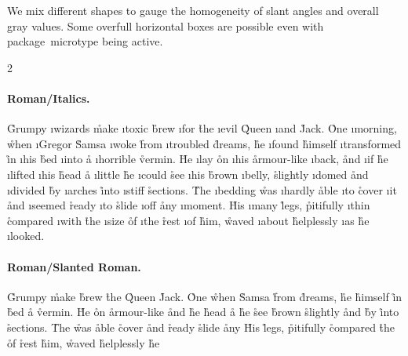 \documentclass[a4paper]{article}
\newcommand*{\packagename}[1]{\mbox{\textsf{#1}}}
\begin{document}
We mix different shapes to gauge the homogeneity of slant angles and
overall gray values.  Some overfull horizontal boxes are possible even with
package~\packagename{microtype} being active.

\setlength{\columnsep}{20pt}
\begin{multicols}{2}\fussy
  \setlength{\overfullrule}{3pt}
  \paragraph{Roman/Italics.}\leavevmode

  \r{Grumpy} \i{wizards} \r{make} \i{toxic} \r{brew} \i{for} \r{the} \i{evil} \r{Queen} \i{and} \r{Jack.}
  \r{One} \i{morning,} \r{when} \i{Gregor} \r{Samsa} \i{woke} \r{from} \i{troubled} \r{dreams,}
  \r{he} \i{found} \r{himself} \i{transformed} \r{in} \i{his} \r{bed} \i{into} \r{a} \i{horrible} \r{vermin.}
  \r{He} \i{lay} \r{on} \i{his} \r{armour-like} \i{back,}
  \r{and} \i{if} \r{he} \i{lifted} \i{his} \r{head}
  \r{a} \i{little} \r{he} \i{could} \r{see} \i{his} \r{brown} \i{belly,}
  \r{slightly} \i{domed} \r{and} \i{divided} \r{by} \i{arches} \r{into} \i{stiff} \r{sections.}
  \r{The} \i{bedding} \r{was} \i{hardly} \r{able} \i{to}
  \r{cover} \i{it} \r{and} \i{seemed} \r{ready} \i{to} \r{slide} \i{off} \r{any} \i{moment.}
  \r{His} \i{many} \r{legs,}
  \r{pitifully} \i{thin} \r{compared} \i{with} \r{the} \i{size} \r{of} \i{the} \r{rest} \i{of} \r{him,}
  \r{waved} \i{about} \r{helplessly} \i{as} \r{he} \i{looked.}

  \paragraph{Roman/Slanted Roman.}\leavevmode

  \r{Grumpy}  \r{make}  \r{brew}  \r{the}  \r{Queen}  \r{Jack.}
  \r{One}  \r{when}  \r{Samsa}  \r{from}  \r{dreams,}
  \r{he}  \r{himself}  \r{in}  \r{bed}  \r{a}  \r{vermin.}
  \r{He}  \r{on}  \r{armour-like} 
  \r{and}  \r{he}   \r{head}
  \r{a}  \r{he}  \r{see}  \r{brown} 
  \r{slightly}  \r{and}  \r{by}  \r{into}  \r{sections.}
  \r{The}  \r{was}  \r{able} 
  \r{cover}  \r{and}  \r{ready}  \r{slide}  \r{any} 
  \r{His}  \r{legs,}
  \r{pitifully}  \r{compared}  \r{the}  \r{of}  \r{rest}  \r{him,}
  \r{waved}  \r{helplessly}  \r{he} 


\end{multicols}
\end{document}
